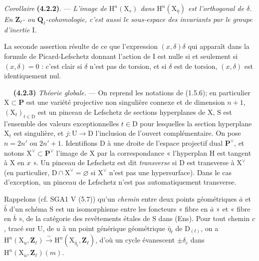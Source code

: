 \documentclass[11pt,leqno]{article}
\newcommand{\Page}[1]{\ifvmode\noindent\else\unskip\ \fi{\footnotesize\textcolor{gray}{[p.\,#1]}}\ \ignorespaces}
\begin{document}
\textit{Corollaire} \textbf{(4.2.2)}. — \textit{L’image de \(\mathrm{H}^n(\mathrm{X}_s)\) dans \(\mathrm{H}^n(\mathrm{X}_{\bar\eta})\) est l’orthogonal de \(\delta\). En \(\mathbf{Z}_\ell\)- ou \(\mathbf{Q}_\ell\)-cohomologie, c’est aussi le sous-espace des invariants par le groupe d’inertie \(\mathrm{I}\).}

La seconde assertion résulte de ce que l’expression \((x,\delta)\delta\) qui apparaît dans la formule de Picard-Lefschetz donnant l’action de \(\mathrm{I}\) est nulle si et seulement si \((x,\delta)=0\) : c’est clair si \(\delta\) n’est pas de torsion, et si \(\delta\) est de torsion, \((x,\delta)\) est identiquement nul.

\Page{220}
\textbf{(4.2.3)} \textit{Théorie globale.} — On reprend les notations de (1.5.6); en particulier \(\mathrm{X}\subset\mathbf{P}\) est une variété projective non singulière connexe et de dimension \(n+1\), \((\mathrm{X}_t)_{t\in\mathrm{D}}\) est un pinceau de Lefschetz de sections hyperplanes de \(\mathrm{X}\), \(\mathrm{S}\) est l’ensemble des valeurs exceptionnelles \(t\in\mathrm{D}\) pour lesquelles la section hyperplane \(\mathrm{X}_t\) est singulière, et \(j:\mathrm{U}\to\mathrm{D}\) l’inclusion de l’ouvert complémentaire. On pose \(n=2n'\) ou \(2n'+1\). Identifions \(\mathrm{D}\) à une droite de l’espace projectif dual \(\mathbf{P}^{\vee}\), et notons \(\mathrm{X}^{\vee}\subset\mathbf{P}^{\vee}\) l’image de \(\mathrm{X}\) par la correspondance « l’hyperplan \(\mathrm{H}\) est tangent à \(\mathrm{X}\) en \(x\) ». Un pinceau de Lefschetz est dit \textit{transverse} si \(\mathrm{D}\) est transverse à \(\mathrm{X}^{\vee}\) (en particulier, \(\mathrm{D}\cap\mathrm{X}^{\vee}=\varnothing\) si \(\mathrm{X}^{\vee}\) n’est pas une hypersurface). Dans le cas d’exception, un pinceau de Lefschetz n’est pas automatiquement transverse.

Rappelons (cf. SGA1 V (5.7)) qu’un \textit{chemin} entre deux points géométriques \(\bar a\) et \(\bar b\) d’un schéma \(\mathrm{S}\) est un isomorphisme entre les foncteurs « fibre en \(\bar a\) » et « fibre en \(\bar b\) », de la catégorie des revêtements étales de \(\mathrm{S}\) dans (Ens). Pour tout chemin \(c\), tracé sur \(\mathrm{U}\), de \(u\) à un point générique géométrique \(\bar\eta_t\) de \(\mathrm{D}_{(t)}\), on a \(\mathrm{H}^n(\mathrm{X}_u,\mathbf{Z}_\ell)\xrightarrow{\sim}\mathrm{H}^n(\mathrm{X}_{\bar\eta_t},\mathbf{Z}_\ell)\), d’où un cycle évanescent \(\pm\delta_c\) dans \(\mathrm{H}^n(\mathrm{X}_u,\mathbf{Z}_\ell)(m)\).
\end{document}
